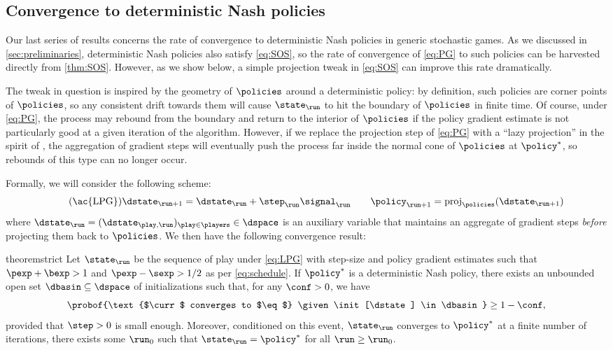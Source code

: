 \subsection{Convergence to deterministic Nash policies}

Our last series of results concerns the rate of convergence to deterministic Nash policies in generic stochastic games.
As we discussed in \cref{sec:preliminaries},
deterministic Nash policies also satisfy  \eqref{eq:SOS}, so the rate of convergence of \eqref{eq:PG} to such policies can be harvested directly from \cref{thm:SOS}.
However, as we show below, a simple projection tweak in \eqref{eq:SOS} can improve this rate dramatically.

The tweak in question is inspired by the geometry of $\policies$ around a deterministic policy:
by definition, such policies are corner points of $\policies$, so any consistent drift towards them will cause $\curr$ to hit the boundary of $\policies$ in finite time.
Of course, under \eqref{eq:PG}, the process may rebound from the boundary and return to the interior of $\policies$ if the policy gradient estimate is not particularly good at a given iteration of the algorithm.
However, if we replace the projection step of \eqref{eq:PG} with a ``lazy projection'' in the spirit of \citet{Zin03}, the aggregation of gradient steps will eventually push the process far inside the normal cone of $\policies$ at $\eq$, so rebounds of this type can no longer occur.

Formally, we will consider the following  scheme:
\begin{equation}
\label{eq:LPG}
\tag{\ac{LPG}}
\next[\dstate]
	= \curr[\dstate] + \curr[\step]\curr[\signal]
	\qquad
\next[\policy]
	= \proj_{\policies}(\next[\dstate])
\end{equation}
where $\curr[\dstate] = (\dstate_{\play,\run})_{\play\in\players} \in \dspace$ is an auxiliary variable that maintains an aggregate of gradient steps \emph{before} projecting them back to $\policies$.
We then have the following convergence result:

\begin{restatable}{theorem}{strict}
\label{thm:strict}
Let $\curr$ be the sequence of play under \eqref{eq:LPG} with step-size and policy gradient estimates such that $\pexp + \bexp >1$ and $\pexp - \sexp > 1/2$ as per \eqref{eq:schedule}.
If $\eq$ is a deterministic Nash policy, there exists an unbounded open set $\dbasin\subseteq\dspace$ of initializations such that, for any $\conf>0$, we have
\begin{equation}
\label{eq:lazy}
\probof{\text{$\curr$ converges to $\eq$} \given \init[\dstate] \in \dbasin}
	\geq 1-\conf,
\end{equation}
provided that $\step>0$ is small enough.
Moreover, conditioned on this event, $\curr$ converges to $\eq$ at a finite number of iterations, \ie there exists some $\run_{0}$ such that $\curr = \eq$ for all $\run\geq\run_{0}$.
\end{restatable}

